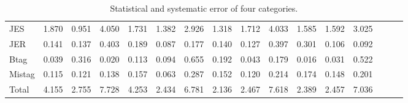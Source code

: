 \begin{sidewaystable}[p]
\begin{tabular}{|l|ccc|ccc|ccc|ccc|ccc|}
  JES                                        & 1.870 & 0.951 & 4.050 & 1.731 & 1.382 & 2.926 & 1.318 & 1.712 & 4.033 & 1.585 & 1.592 & 3.025 \\ 
  JER                                        & 0.141 & 0.137 & 0.403 & 0.189 & 0.087 & 0.177 & 0.140 & 0.127 & 0.397 & 0.301 & 0.106 & 0.092 \\ 
  Btag                                       & 0.039 & 0.316 & 0.020 & 0.113 & 0.094 & 0.655 & 0.192 & 0.043 & 0.179 & 0.016 & 0.031 & 0.522 \\ 
  Mistag                                     & 0.115 & 0.121 & 0.138 & 0.157 & 0.063 & 0.287 & 0.152 & 0.120 & 0.214 & 0.174 & 0.148 & 0.201 \\ 
  \hline
  Total                                      & 4.155 & 2.755 & 7.728 & 4.253 & 2.434 & 6.781 & 2.136 & 2.467 & 7.618 & 2.389 & 2.457 & 7.036 \\ 
  \hline
  \end{tabular}
  \caption{ Statistical and systematic error of four categories. }
  \label{tab:syst_alt}
\end{sidewaystable}
